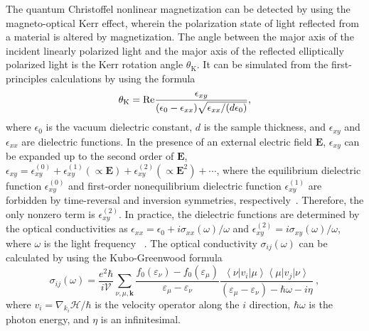 \documentclass[aps,prl,twocolumn,amsmath,amssymb,showpacs, superscriptaddress,notitlepage,longbibliography,10pt]{revtex4-1}
\begin{document}
The quantum Christoffel nonlinear magnetization can be detected by using the magneto-optical Kerr effect, wherein the polarization state of light reflected from a material is altered by magnetization.
The angle between the major axis of the incident linearly polarized light and the major axis of the reflected elliptically polarized light is the Kerr rotation angle $\theta_\text{K}$. It can be simulated from the first-principles calculations by using the formula~\cite{Feng_DFT_Kerr_2015, Guo_Kerr_1994,Guo_Kerr_1995}
\begin{equation}\label{Eq: theta_K}
\theta_\text{K} =  {\rm Re} \frac{\epsilon_{xy}}{(\epsilon_0-\epsilon_{xx}) \sqrt{\epsilon_{xx}/(d\epsilon_0)}} ,
\end{equation}
where $\epsilon_0$ is the vacuum dielectric constant, $d$ is the sample thickness, and $\epsilon_{xy}$ and $\epsilon_{xx}$ are dielectric functions. In the presence of an external electric field $\mathbf{E}$,  $\epsilon_{xy}$ can be expanded up to the second order of $\mathbf{E}$, $\epsilon_{xy}=\epsilon_{xy}^{(0)}+\epsilon_{xy}^{(1)}(\propto\mathbf{E})+\epsilon_{xy}^{(2)}(\propto\mathbf{E}^2)+\cdots$, where the equilibrium dielectric function $\epsilon_{xy}^{(0)}$ and first-order nonequilibrium dielectric function $\epsilon_{xy}^{(1)}$ are forbidden by time-reversal and inversion symmetries, respectively~\cite{Tsirkin18prb}. Therefore, the only nonzero term is $\epsilon_{xy}^{(2)}$. In practice, the dielectric functions are determined by the optical conductivities as $\epsilon_{xx}=\epsilon_0+i\sigma_{xx}(\omega)/\omega$ and $\epsilon_{xy}^{(2)}=i\sigma_{xy}(\omega)/\omega$, where $\omega$ is the light frequency ~\cite{Sugano13book,Kuch15book}. The optical conductivity $\sigma_{ij}(\omega)$ can be calculated by using the Kubo-Greenwood formula~\cite{Kubo:1957,Greenwood:1958}
\begin{equation}\label{Eq: opt-cond}
\sigma_{ij}(\omega)=\frac{e^2 \hbar}{i \mathcal{V}}  \sum_{\nu, \mu, \mathbf{k}} \frac{f_0\left(\varepsilon_\nu\right)-f_0\left(\varepsilon_\mu\right)}{\varepsilon_\mu-\varepsilon_\nu} \frac{\left\langle \nu\right| v_i \left|\mu \right\rangle\left\langle \mu \right| v_j \left| \nu \right\rangle} {\left(\varepsilon_\mu-\varepsilon_\nu\right)-\hbar \omega-i \eta}~,
\end{equation}
where $v_i=\nabla_{k_i}\mathcal{H}/\hbar$ is the velocity operator along the $i$ direction, $\hbar\omega$ is the photon energy, and $\eta$ is an infinitesimal.
\end{document}
